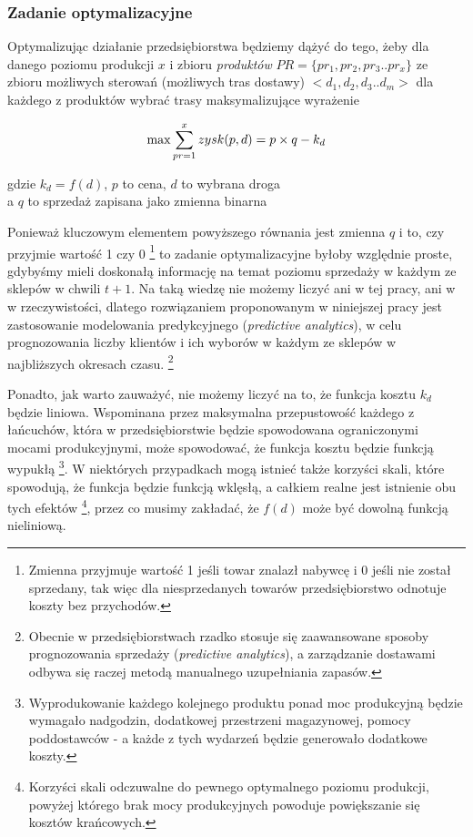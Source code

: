 \documentclass[polish, twoside, 12pt, a4paper]{article}
\theoremstyle{definition}
\theoremstyle{plain}
\theoremstyle{remark}
\begin{document}
\newpage

\subsubsection{Zadanie optymalizacyjne} 
Optymalizując działanie przedsiębiorstwa będziemy dążyć do tego, żeby dla danego poziomu produkcji $x$ i zbioru \textit{produktów} $PR = \{pr_1,pr_2,pr_3..pr_x\} $ ze zbioru możliwych sterowań (możliwych tras dostawy) $<d_1,d_2,d_3..d_m>$ dla każdego z produktów wybrać trasy maksymalizujące wyrażenie

\begin{equation} \label{eq:teoria1}
\max \sum\limits_{pr=1}^x  zysk (p,d) = p \times q - k_d \\
\end{equation}

\begin{center}
 gdzie $k_d = f(d)$, $p$ to cena, $d$ to wybrana droga \\
 a $q$ to sprzedaż zapisana jako zmienna binarna
\end{center}

Ponieważ kluczowym elementem powyższego równania jest zmienna $q$ i to, czy przyjmie wartość 1 czy 0 \footnote{Zmienna przyjmuje wartość 1 jeśli towar znalazł nabywcę i 0 jeśli nie został sprzedany, tak więc dla niesprzedanych towarów przedsiębiorstwo odnotuje koszty bez przychodów.} to zadanie optymalizacyjne byłoby względnie proste, gdybyśmy mieli doskonałą informację na temat poziomu sprzedaży w każdym ze sklepów w chwili $ t + 1 $. Na taką wiedzę nie możemy liczyć ani w tej pracy, ani w w rzeczywistości, dlatego rozwiązaniem proponowanym w niniejszej pracy jest zastosowanie modelowania predykcyjnego (\textit{predictive analytics}), w celu prognozowania liczby klientów i ich wyborów w każdym ze sklepów w najbliższych okresach czasu. \footnote{Obecnie w przedsiębiorstwach rzadko stosuje się zaawansowane sposoby prognozowania sprzedaży (\textit{predictive analytics}), a zarządzanie dostawami odbywa się raczej metodą manualnego uzupełniania zapasów.} 

Ponadto, jak warto zauważyć, nie możemy liczyć na to, że funkcja kosztu $k_d$ będzie liniowa. Wspominana przez \cite{Kawa2010} maksymalna przepustowość każdego z łańcuchów, która w przedsiębiorstwie będzie spowodowana ograniczonymi mocami produkcyjnymi, może spowodować, że funkcja kosztu będzie funkcją wypukłą \footnote{Wyprodukowanie każdego kolejnego produktu ponad moc produkcyjną będzie wymagało nadgodzin, dodatkowej przestrzeni magazynowej, pomocy poddostawców - a każde z tych wydarzeń będzie generowało dodatkowe koszty.}. W niektórych przypadkach mogą istnieć także korzyści skali, które spowodują, że funkcja będzie funkcją wklęsłą, a całkiem realne jest istnienie obu tych efektów  \footnote{Korzyści skali odczuwalne do pewnego optymalnego poziomu produkcji, powyżej którego brak mocy produkcyjnych powoduje  powiększanie się kosztów krańcowych.}, przez co musimy zakładać, że $f(d)$ może być dowolną funkcją nieliniową.
\end{document}
